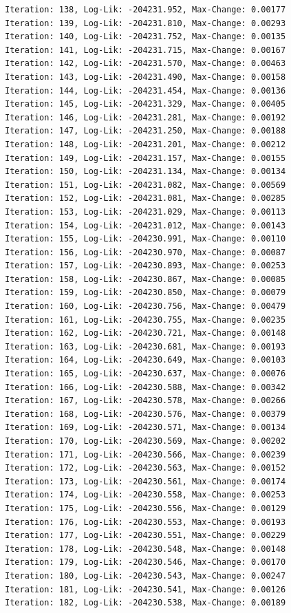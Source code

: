 \documentclass[
  letterpaper,
  DIV=11,
  numbers=noendperiod]{scrreport}
\begin{document}
\begin{verbatim}
Iteration: 138, Log-Lik: -204231.952, Max-Change: 0.00177
Iteration: 139, Log-Lik: -204231.810, Max-Change: 0.00293
Iteration: 140, Log-Lik: -204231.752, Max-Change: 0.00135
Iteration: 141, Log-Lik: -204231.715, Max-Change: 0.00167
Iteration: 142, Log-Lik: -204231.570, Max-Change: 0.00463
Iteration: 143, Log-Lik: -204231.490, Max-Change: 0.00158
Iteration: 144, Log-Lik: -204231.454, Max-Change: 0.00136
Iteration: 145, Log-Lik: -204231.329, Max-Change: 0.00405
Iteration: 146, Log-Lik: -204231.281, Max-Change: 0.00192
Iteration: 147, Log-Lik: -204231.250, Max-Change: 0.00188
Iteration: 148, Log-Lik: -204231.201, Max-Change: 0.00212
Iteration: 149, Log-Lik: -204231.157, Max-Change: 0.00155
Iteration: 150, Log-Lik: -204231.134, Max-Change: 0.00134
Iteration: 151, Log-Lik: -204231.082, Max-Change: 0.00569
Iteration: 152, Log-Lik: -204231.081, Max-Change: 0.00285
Iteration: 153, Log-Lik: -204231.029, Max-Change: 0.00113
Iteration: 154, Log-Lik: -204231.012, Max-Change: 0.00143
Iteration: 155, Log-Lik: -204230.991, Max-Change: 0.00110
Iteration: 156, Log-Lik: -204230.970, Max-Change: 0.00087
Iteration: 157, Log-Lik: -204230.893, Max-Change: 0.00253
Iteration: 158, Log-Lik: -204230.867, Max-Change: 0.00085
Iteration: 159, Log-Lik: -204230.850, Max-Change: 0.00079
Iteration: 160, Log-Lik: -204230.756, Max-Change: 0.00479
Iteration: 161, Log-Lik: -204230.755, Max-Change: 0.00235
Iteration: 162, Log-Lik: -204230.721, Max-Change: 0.00148
Iteration: 163, Log-Lik: -204230.681, Max-Change: 0.00193
Iteration: 164, Log-Lik: -204230.649, Max-Change: 0.00103
Iteration: 165, Log-Lik: -204230.637, Max-Change: 0.00076
Iteration: 166, Log-Lik: -204230.588, Max-Change: 0.00342
Iteration: 167, Log-Lik: -204230.578, Max-Change: 0.00266
Iteration: 168, Log-Lik: -204230.576, Max-Change: 0.00379
Iteration: 169, Log-Lik: -204230.571, Max-Change: 0.00134
Iteration: 170, Log-Lik: -204230.569, Max-Change: 0.00202
Iteration: 171, Log-Lik: -204230.566, Max-Change: 0.00239
Iteration: 172, Log-Lik: -204230.563, Max-Change: 0.00152
Iteration: 173, Log-Lik: -204230.561, Max-Change: 0.00174
Iteration: 174, Log-Lik: -204230.558, Max-Change: 0.00253
Iteration: 175, Log-Lik: -204230.556, Max-Change: 0.00129
Iteration: 176, Log-Lik: -204230.553, Max-Change: 0.00193
Iteration: 177, Log-Lik: -204230.551, Max-Change: 0.00229
Iteration: 178, Log-Lik: -204230.548, Max-Change: 0.00148
Iteration: 179, Log-Lik: -204230.546, Max-Change: 0.00170
Iteration: 180, Log-Lik: -204230.543, Max-Change: 0.00247
Iteration: 181, Log-Lik: -204230.541, Max-Change: 0.00126
Iteration: 182, Log-Lik: -204230.538, Max-Change: 0.00189

\end{verbatim}
\end{document}
